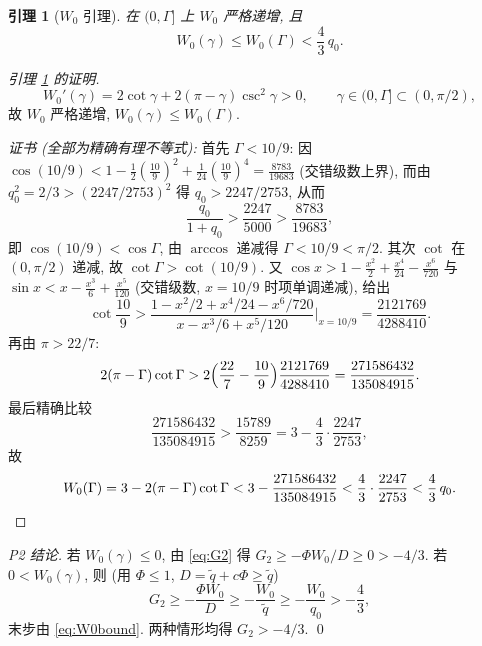 \documentclass[UTF8]{ctexart}
\newtheorem{lemma}[theorem]{引理}
\begin{document}
\begin{lemma}[$W_0$ 引理]\label{lem:W0}
在 $(0,\Gamma]$ 上 $W_0$ 严格递增, 且
\begin{equation}
	W_0(\gamma)\le W_0(\Gamma)<\frac43\,q_0.
	\label{eq:W0bound}
\end{equation}
\end{lemma}

\begin{proof}[引理 \ref{lem:W0} 的证明]
\begin{equation}
	W_0'(\gamma)=2\cot\gamma+2(\pi-\gamma)\csc^2\gamma>0,\qquad
	\gamma\in(0,\Gamma]\subset(0,\pi/2),
\end{equation}
故 $W_0$ 严格递增, $W_0(\gamma)\le W_0(\Gamma)$.

\emph{证书 (全部为精确有理不等式):} 首先 $\Gamma<10/9$: 因
$\cos(10/9)<1-\frac12(\frac{10}{9})^2+\frac1{24}(\frac{10}{9})^4=\frac{8783}{19683}$
(交错级数上界), 而由 $q_0^2=2/3>(2247/2753)^2$ 得 $q_0>2247/2753$, 从而
\begin{equation}
	\frac{q_0}{1+q_0}>\frac{2247}{5000}>\frac{8783}{19683},
\end{equation}
即 $\cos(10/9)<\cos\Gamma$, 由 $\arccos$ 递减得 $\Gamma<10/9<\pi/2$.
其次 $\cot$ 在 $(0,\pi/2)$ 递减, 故 $\cot\Gamma>\cot(10/9)$. 又
$\cos x>1-\frac{x^2}2+\frac{x^4}{24}-\frac{x^6}{720}$ 与
$\sin x<x-\frac{x^3}6+\frac{x^5}{120}$ (交错级数, $x=10/9$ 时项单调递减), 给出
\begin{equation}
	\cot\frac{10}{9}>\frac{1-x^2/2+x^4/24-x^6/720}{x-x^3/6+x^5/120}
	\Big|_{x=10/9}=\frac{2121769}{4288410}.
\end{equation}
再由 $\pi>22/7$:
\begin{equation}
	2(\pi-\Gamma)\cot\Gamma>2\Bigl(\frac{22}{7}-\frac{10}{9}\Bigr)
	\frac{2121769}{4288410}=\frac{271586432}{135084915}.
\end{equation}
最后精确比较
\begin{equation}
	\frac{271586432}{135084915}>\frac{15789}{8259}
	=3-\frac43\cdot\frac{2247}{2753},
\end{equation}
故
\begin{equation}
	W_0(\Gamma)=3-2(\pi-\Gamma)\cot\Gamma
	<3-\frac{271586432}{135084915}
	<\frac43\cdot\frac{2247}{2753}<\frac43\,q_0.
	\qedhere
\end{equation}
\end{proof}

\emph{P2 结论.} 若 $W_0(\gamma)\le0$, 由 \eqref{eq:G2} 得
$G_2\ge-\Phi W_0/D\ge0>-4/3$. 若 $0<W_0(\gamma)$, 则 (用 $\Phi\le1$,
$D=\tilde q+c\Phi\ge\tilde q$)
\begin{equation}
	G_2\ge-\frac{\Phi W_0}{D}\ge-\frac{W_0}{\tilde q}
	\ge-\frac{W_0}{q_0}>-\frac43,
\end{equation}
末步由 \eqref{eq:W0bound}. 两种情形均得 $G_2>-4/3$. \qed
\end{document}

